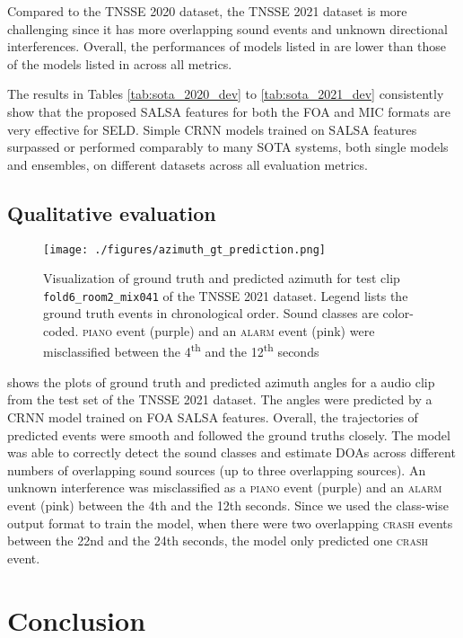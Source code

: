 \documentclass[journal]{IEEEtran}
\begin{document}
Compared to the TNSSE 2020 dataset, the TNSSE 2021 dataset is more challenging since it has more overlapping sound events and unknown directional interferences. Overall, the performances of models listed in  are lower than those of the models listed in  across all metrics.

The results in Tables \ref{tab:sota_2020_dev} to \ref{tab:sota_2021_dev} consistently show that the proposed SALSA features for both the FOA and MIC formats are very effective for SELD. Simple CRNN models trained on SALSA features surpassed or performed comparably to many SOTA systems, both single models and ensembles, on different datasets across all evaluation metrics.

\subsection{Qualitative evaluation}

\begin{figure}[tb]
    \centering
    \texttt{[image: ./figures/azimuth\_gt\_prediction.png]}
    \vspace{-0.5cm}
    \caption{Visualization of ground truth and predicted azimuth for test clip \texttt{fold6\_room2\_mix041} of the TNSSE 2021 dataset. Legend lists the ground truth events in chronological order. Sound classes are color-coded. 
    {\textsc{piano} event (purple) and an \textsc{alarm} event (pink) were misclassified between the \num{4}\textsuperscript{th} and the \num{12}\textsuperscript{th} seconds}}
\label{fig:gt_pred_visualization}
\end{figure} 

 shows the plots of ground truth and predicted azimuth angles for a audio clip from the test set of the TNSSE 2021 dataset. The angles were predicted by a CRNN model trained on FOA SALSA features. Overall, the trajectories of predicted events were smooth and followed the ground truths closely. The model was able to correctly detect the sound classes and estimate DOAs across different numbers of overlapping sound sources (up to three overlapping sources). An unknown interference was misclassified as a \textsc{piano} event (purple) and an \textsc{alarm} event (pink) between the \num{4}th and the \num{12}th seconds. Since we used the class-wise output format to train the model, when there were two overlapping \textsc{crash} events between the \num{22}nd and the \num{24}th seconds, the model only predicted one \textsc{crash} event. \section{Conclusion}
\label{sec:conclusion}
\end{document}
